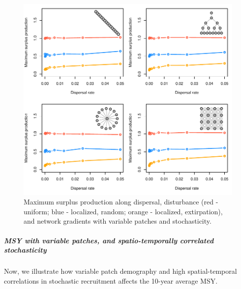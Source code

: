 \documentclass[]{article}
\let\oldsubparagraph\subparagraph
\renewcommand{\subparagraph}[1]{\oldsubparagraph{#1}\mbox{}}
\begin{document}
\begin{figure}[H]

{\centering \includegraphics{Managing_for_ecological_surprises_in_metapopulations_makeHTML_files/figure-latex/MSY with variable patches and stochasticity-1} 

}

\caption{Maximum surplus production along dispersal, disturbance (red - uniform; blue - localized, random; orange - localized, extirpation), and network gradients with variable patches and stochasticity.}\label{fig:MSY with variable patches and stochasticity}
\end{figure}
\newpage

\hypertarget{msy-with-variable-patches-and-spatio-temporally-correlated-stochasticity}{%
\subparagraph{MSY with variable patches, and spatio-temporally
correlated
stochasticity}\label{msy-with-variable-patches-and-spatio-temporally-correlated-stochasticity}}

Now, we illustrate how variable patch demography and high
spatial-temporal correlations in stochastic recruitment affects the
10-year average MSY.
\end{document}
